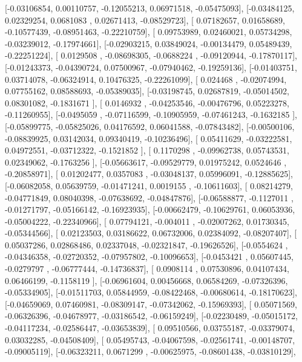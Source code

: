 \documentclass{article}
\begin{document}
       [-0.03106854,  0.00110757, -0.12055213,  0.06971518, -0.05475093],
       [-0.03484125,  0.02329254,  0.0681083 ,  0.02671413, -0.08529723],
       [ 0.07182657,  0.01658689, -0.10577439, -0.08951463, -0.22210759],
       [ 0.09753989,  0.02460021,  0.05734298, -0.03239012, -0.17974661],
       [-0.02903215,  0.03849024, -0.00134479,  0.05489439, -0.22251224],
       [ 0.0129508 , -0.08698305, -0.0688224 , -0.09120944, -0.17870117],
       [-0.01243373, -0.04390724,  0.07500967, -0.07940462, -0.19259136],
       [-0.01403751,  0.03714078, -0.06324914,  0.10476325, -0.22261099],
       [ 0.024468  , -0.02074994,  0.07755162,  0.08588693, -0.05389035],
       [-0.03198745,  0.02687819, -0.05014502,  0.08301082, -0.1831671 ],
       [ 0.0146932 , -0.04253546, -0.00476796,  0.05223278, -0.11260955],
       [-0.0495059 , -0.07116599, -0.10905959, -0.07461243, -0.1632185 ],
       [-0.05899775, -0.05825026,  0.04176592,  0.06041588, -0.07843482],
       [-0.00500106, -0.08839925,  0.03142034,  0.09340419, -0.10236496],
       [ 0.05411629, -0.03222581,  0.04972551, -0.03712322, -0.1521852 ],
       [ 0.1170298 , -0.09962738,  0.05743531,  0.02349062, -0.1763256 ],
       [-0.05663617, -0.09529779,  0.01975242,  0.0524646 , -0.20858971],
       [ 0.01202477,  0.0357083 , -0.03048137,  0.05996091, -0.12885625],
       [-0.06082058,  0.05639759, -0.01471241,  0.0019155 , -0.10611603],
       [ 0.08214279, -0.04771849,  0.08040398, -0.07638692, -0.04847876],
       [-0.06588877, -0.1127011 , -0.01271797, -0.05166142, -0.16923935],
       [-0.00662479, -0.10629761,  0.06053936, -0.05004222, -0.22340966],
       [ 0.07794121, -0.004011  , -0.02007262,  0.01730345, -0.05344566],
       [ 0.02123503,  0.03186622,  0.06732006,  0.02384092, -0.08207407],
       [ 0.05037286,  0.02868486,  0.02337048, -0.02321847, -0.19626526],
       [-0.0554624 , -0.04346358, -0.02720352, -0.07957802, -0.10096653],
       [-0.0453421 ,  0.05607445, -0.0279797 , -0.06777444, -0.14736837],
       [ 0.0908114 ,  0.07530896,  0.04107434,  0.06466199, -0.1158119 ],
       [-0.06961604,  0.00456668,  0.06584269, -0.07326396, -0.05334905],
       [-0.01511703,  0.05844959, -0.08422468, -0.00680614, -0.18170623],
       [-0.04659069,  0.07460981, -0.08309147, -0.07342062, -0.15969393],
       [ 0.05071569, -0.06326396, -0.04678977, -0.03186542, -0.06159249],
       [-0.02230489, -0.05015172, -0.04117234, -0.02586447, -0.03653839],
       [ 0.09510566,  0.03755187, -0.03379074,  0.03032285, -0.04508409],
       [ 0.05495743, -0.04067598, -0.02561741, -0.00148707, -0.09005119],
       [-0.06323211,  0.0671299 , -0.00625975, -0.08601438, -0.03810129],
\end{document}
